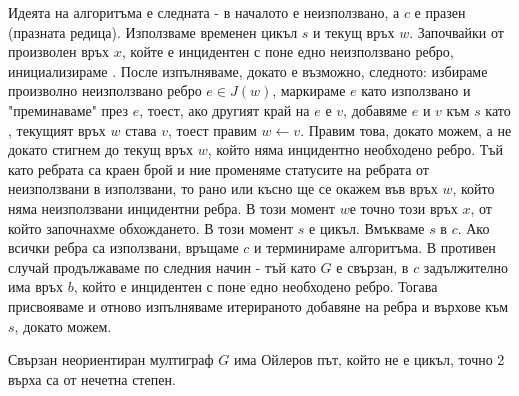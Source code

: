 \begin{note}
    Идеята на алгоритъма е следната - в началото е неизползвано, а \(c\) е празен (празната редица). 
    Използваме временен цикъл \(s\) и текущ връх \(w\). Започвайки от произволен връх \(x\), койте е 
    инцидентен с поне едно неизползвано ребро, инициализираме . 
    После изпълняваме, докато е възможно, следното: избираме произволно неизползвано ребро \(e \in J(w)\), 
    маркираме \(e\) като използвано и "преминаваме" през \(e\), тоест, ако другият край на \(e\) е \(v\), 
    добавяме \(e\) и \(v\) към \(s\) като , текущият връх \(w\) става \(v\), 
    тоест правим \(w \leftarrow v\). Правим това, докато можем, а не докато стигнем до текущ връх \(w\), 
    който няма инцидентно необходено ребро. Тъй като ребрата са краен брой и ние променяме статусите на 
    ребрата от неизползвани в използвани, то рано или късно ще се окажем във връх \(w\), който няма 
    неизползвани инцидентни ребра. В този момент \(w\)е точно този връх \(x\), от който започнахме 
    обхождането. В този момент \(s\) е цикъл. Вмъкваме \(s\) в \(c\). Ако всички ребра са използвани, 
    връщаме \(c\) и терминираме алгоритъма. В противен случай продължаваме по следния начин - тъй като 
    \(G\) е свързан, в \(c\) задължително има връх \(b\), който е инцидентен с поне едно необходено ребро. 
    Тогава присвояваме  и отново изпълняваме итерираното добавяне 
    на ребра и върхове към \(s\), докато можем.
\end{note}

\begin{theorem}
    Свързан неориентиран мултиграф \(G\) има Ойлеров път, който не е цикъл, \totw точно 2 върха са от 
    нечетна степен.
\end{theorem}

